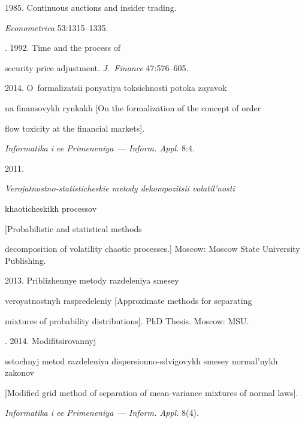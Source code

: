 

 1985. Continuous auctions and insider trading. 


\textit{Econometrica} 53:1315--1335.







. 1992. Time and the process of 


security price adjustment. {\it J.~Finance} 47:576--605.







 2014. O~formalizatsii ponyatiya toksichnosti potoka zayavok 


na finansovykh rynkakh [On the formalization of the concept of order 


flow toxicity at the financial markets]. 


\textit{Informatika i ee Primeneniya}~--- \textit{Inform. Appl.} 8:4.







 2011. 


{\it Verojatnostno-statisticheskie metody dekompozitsii volatil'nosti 


khaoticheskikh processov} [Probabilistic and statistical methods 


decomposition of volatility chaotic processes.] Moscow: Moscow State University Publishing.







 2013. Priblizhennye metody razdeleniya smesey 


veroyatnostnyh raspredeleniy [Approximate methods for separating 


mixtures of probability distributions]. PhD Thesis. Moscow: MSU.







. 2014. Modifitsirovannyj 


setochnyj metod razdeleniya dispersionno-sdvigovykh smesey normal'nykh zakonov 


[Modified grid method of separation of mean-variance mixtures of normal laws].


 {\it Informatika i ee Primeneniya}~--- \textit{Inform. Appl.} 8(4).






